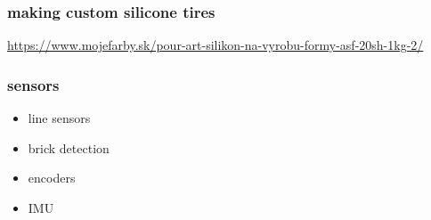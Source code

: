 \documentclass{beamer}
\begin{document}
\begin{frame}
  
  \frametitle{\bf making custom silicone tires}
  \url{https://www.mojefarby.sk/pour-art-silikon-na-vyrobu-formy-asf-20sh-1kg-2/}


\end{frame}





\begin{frame}
  
  \frametitle{\bf sensors}

  \begin{itemize}
    \item line sensors
    \item brick detection
    \item encoders
    \item IMU
  \end{itemize}

\end{frame}
\end{document}

